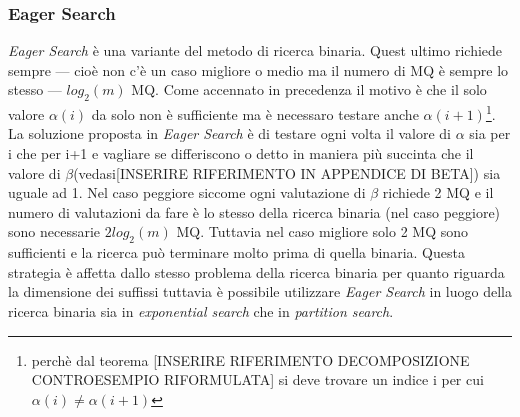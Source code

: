 \subsubsection{Eager Search}
\textit{Eager Search} è una variante del metodo di ricerca binaria. Quest ultimo richiede sempre --- cioè non c'è un caso migliore o medio ma il numero di \ac{MQ} è sempre lo stesso --- $log_{2}(m)$ \ac{MQ}. Come accennato in precedenza il motivo è che il solo valore $\alpha(i)$ da solo non è sufficiente ma è necessaro testare anche $\alpha(i+1)$\footnote{perchè dal teorema [INSERIRE RIFERIMENTO DECOMPOSIZIONE CONTROESEMPIO RIFORMULATA] si deve trovare un indice i per cui $\alpha(i) \neq \alpha(i+1)$}. La soluzione proposta in \textit{Eager Search} è di testare ogni volta il valore di $\alpha$ sia per i che per i+1 e vagliare se differiscono o detto in maniera più succinta che il
valore di $\beta$(vedasi[INSERIRE RIFERIMENTO IN APPENDICE DI BETA]) sia uguale ad 1. Nel caso peggiore siccome ogni valutazione di $\beta$ richiede 2 \ac{MQ} e il numero di valutazioni da fare è lo stesso della ricerca binaria (nel caso peggiore) sono necessarie $2log_{2}(m)$ \ac{MQ}. Tuttavia nel caso migliore solo 2 \ac{MQ} sono sufficienti e la ricerca può terminare molto prima di quella binaria. Questa strategia è affetta dallo stesso problema della ricerca binaria per quanto riguarda la dimensione dei suffissi tuttavia è possibile utilizzare \textit{Eager Search} in luogo della ricerca binaria sia in \textit{exponential search} che in \textit{partition search}. 

\noindent

